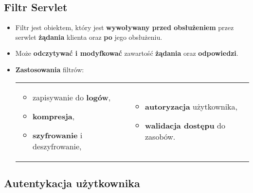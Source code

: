 \documentclass[../main.tex]{subfiles}
\begin{document}
    \subsection{Filtr Servlet}
    \begin{itemize}
        \item Filtr jest obiektem, który jest \textbf{wywoływany przed obsłużeniem} przez serwlet \textbf{żądania} klienta oraz \textbf{po} jego obsłużeniu.
        \item Może \textbf{odczytywać i modyfkować} zawartość \textbf{żądania} oraz \textbf{odpowiedzi}.
        \item \textbf{Zastosowania} filtrów:
        \begin{table}[H]
            \begin{center}
                \begin{tabular}{p{8cm} p{8cm}}
                    \begin{itemize}
                        \item zapisywanie do \textbf{logów},
                        \item \textbf{kompresja},
                        \item \textbf{szyfrowanie} i deszyfrowanie,
                    \end{itemize}
                    &
                    \begin{itemize}
                        \item \textbf{autoryzacja} użytkownika,
                        \item \textbf{walidacja dostępu} do zasobów.
                    \end{itemize}
                \end{tabular}
            \end{center}
        \end{table}
    \end{itemize}

    \subsection{Autentykacja użytkownika}
\end{document}

